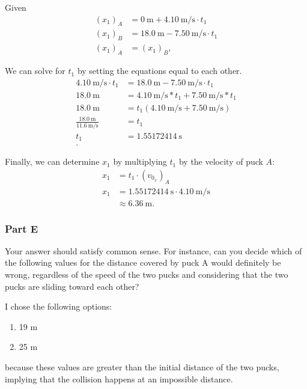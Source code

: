\begin{solution}
	Given
	\begin{align*}
		\left( x_1 \right)_{A} &= 0~\text{m}+4.10~\text{m/s} \cdot t_1 \\
		\left( x_1 \right)_{B} &= 18.0~\text{m} - 7.50~\text{m/s} \cdot t_1 \\
		\left( x_1 \right)_{A} &= \left( x_1 \right)_{B}
		,\end{align*}

	We can solve for $t_1$ by setting the equations equal to each other.
	\begin{align*}
		4.10~\text{m/s} \cdot t_1 &= 18.0~\text{m} - 7.50~\text{m/s} \cdot t_1 \\
		18.0~\text{m} &= 4.10~\text{m/s} * t_1 + 7.50~\text{m/s} * t_1 \\
		18.0~\text{m} &= t_1 \left( 4.10~\text{m/s} + 7.50~\text{m/s} \right) \\
		\frac{18.0~\text{m}}{11.6~\text{m/s}} &= t_1 \\
		t_1 &= 1.55172414~\text{s} \\
		.\end{align*}

	Finally, we can determine $x_1$ by multiplying $t_1$ by the velocity of puck $A$:
	\begin{align*}
		x_1 &= t_1 \cdot \left( v_{0_{x}} \right)_{A} \\
		x_1 &= 1.55172414~\text{s} \cdot 4.10~\text{m/s} \\
		&\approx 6.36~\text{m}
		.\end{align*}
\end{solution}

\subsubsection{Part E}

Your answer should satisfy common sense. For instance, can you decide which of the following values for the distance covered by puck A would definitely be wrong, regardless of the speed of the two pucks and considering that the two pucks are sliding toward each other?

\vspace{1em}

\begin{solution}
	I chose the following options:
	\begin{enumerate}
		\item 19 m
		\item 25 m
	\end{enumerate}
	because these values are greater than the initial distance of the two pucks, implying that the collision happens at an impossible distance.
\end{solution}

